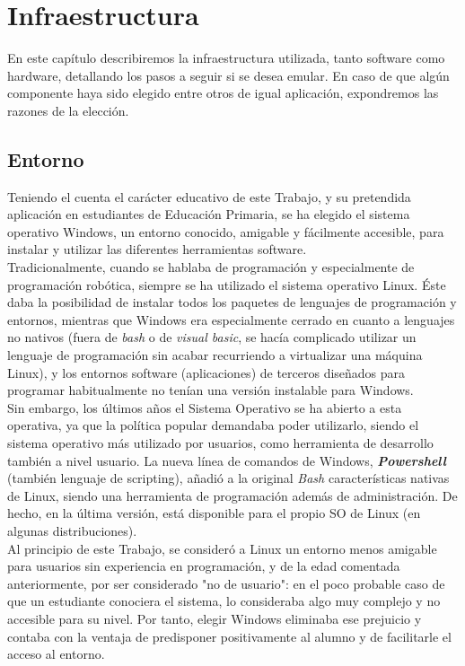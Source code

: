 \chapter{Infraestructura}
\label{cap:infra}

En este capítulo describiremos la infraestructura utilizada, tanto software como hardware, detallando los pasos a seguir si se desea emular. En caso de que algún componente haya sido elegido entre otros de igual aplicación, expondremos las razones de la elección.


\section{Entorno}\label{sec:entorno}
Teniendo el cuenta el carácter educativo de este Trabajo, y su pretendida aplicación en estudiantes de Educación Primaria, se ha elegido el sistema operativo Windows, un entorno conocido, amigable y fácilmente accesible, para instalar y utilizar las diferentes herramientas software. \\
Tradicionalmente, cuando se hablaba de programación y especialmente de programación robótica, siempre se ha utilizado el sistema operativo Linux. Éste daba la posibilidad de instalar todos los paquetes de lenguajes de programación y entornos, mientras que Windows era especialmente cerrado en cuanto a lenguajes no nativos (fuera de \textit{bash} o de \textit{visual basic}, se hacía complicado utilizar un lenguaje de programación sin acabar recurriendo a virtualizar una máquina Linux), y los entornos software (aplicaciones) de terceros diseñados para programar habitualmente no tenían una versión instalable para Windows. \\
Sin embargo, los últimos años el Sistema Operativo se ha abierto a esta operativa, ya que la política popular demandaba poder utilizarlo, siendo el sistema operativo más utilizado por usuarios, como herramienta de desarrollo también a nivel usuario. La nueva línea de comandos de Windows, \textbf{\textit{Powershell}} (también lenguaje de scripting), añadió a la original \textit{Bash} características nativas de Linux, siendo una herramienta de programación además de administración. De hecho, en la última versión, está disponible para el propio SO de Linux (en algunas distribuciones). \\
Al principio de este Trabajo, se consideró a Linux un entorno menos amigable para usuarios sin experiencia en programación, y de la edad comentada anteriormente, por ser considerado "no de usuario": en el poco probable caso de que un estudiante conociera el sistema, lo consideraba algo muy complejo y no accesible para su nivel. Por tanto, elegir Windows eliminaba ese prejuicio y contaba con la ventaja de predisponer positivamente al alumno y de facilitarle el acceso al entorno. 

